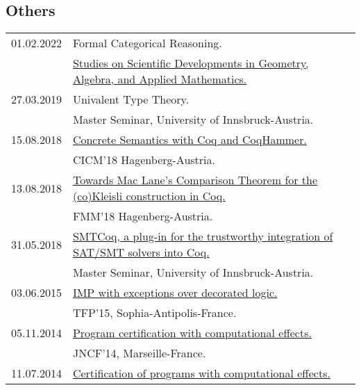\documentclass[a4paper,9pt]{article} %
\begin{document}
\subsection*{Others}
\begin{longtable}{ll}	
{\normalsize 01.02.2022} & {Formal Categorical Reasoning.}\\
&
 \href{https://etkinlik.ulakbim.gov.tr/event/12/}{Studies on Scientific Developments in Geometry, Algebra, and Applied
Mathematics.}\\[0.25cm]
{\normalsize 27.03.2019} & {Univalent Type Theory.}\\
& Master Seminar, University of Innsbruck-Austria.\\[0.25cm]
{\normalsize15.08.2018} & \href{https://cicm-conference.org/2018/slides/T16.pdf}{Concrete Semantics with Coq and
CoqHammer.}\\
& CICM'18 Hagenberg-Austria.\\[0.25cm]
{\normalsize13.08.2018} & \href{https://cicm-conference.org/2018/slides/FMM5.pdf}{Towards Mac Lane's Comparison Theorem for the (co)Kleisli construction in Coq.}\\
& FMM'18 Hagenberg-Austria.\\[0.25cm]
{\normalsize31.05.2018} & \href{http://cl-informatik.uibk.ac.at/teaching/ss18/ms2/slides/BE.pdf}{SMTCoq, a plug-in for the trustworthy integration of SAT/SMT solvers into Coq.}\\
& Master Seminar, University of Innsbruck-Austria.\\[0.25cm]
{\normalsize03.06.2015} & \href{ftp://ftp-sop.inria.fr/indes/TFP15/TFP2015_talk_6.pdf}{ IMP with exceptions over decorated logic.} \\
& TFP'15, Sophia-Antipolis-France.\\[0.25cm]
{\normalsize05.11.2014} & \href{http://www.lifl.fr/jncf2014/files/slides/ekici.pdf}{Program certification with computational effects.}\\
& JNCF'14, Marseille-France.\\[0.25cm]
{\normalsize11.07.2014} & \href{http://ljk.imag.fr/membres/Burak.Ekici/CICM14/BurakEkici_presentation.pdf}{ Certification of programs with computational effects.} \\

\end{longtable}
\end{document}
